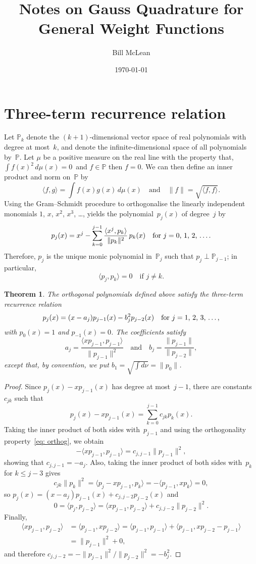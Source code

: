 \documentclass[12pt,a4paper]{article}
\title{Notes on Gauss Quadrature for General Weight Functions}
\author{Bill McLean}
\date{\today}
\newtheorem{theorem}{Theorem}
\newcommand{\iprod}[1]{\langle#1\rangle}
\newcommand{\Poly}{\mathbb{P}}
\begin{document}
\maketitle
\tableofcontents
\section{Three-term recurrence relation}
Let $\Poly_k$ denote the $(k+1)$-dimensional vector space of real 
polynomials with degree at most~$k$, and denote the 
infinite-dimensional space of all polynomials by~$\Poly$.  Let $\mu$ 
be a positive measure on the real line with the property that, 
$\int f(x)^2\,d\mu(x)=0$~and $f\in\Poly$ then $f=0$.
We can then define an inner product and norm on~$\Poly$  by
\[
\iprod{f,g}=\int f(x)g(x)\,d\mu(x)\quad\text{and}\quad
\|f\|=\sqrt{\iprod{f,f}}.
\]
Using the Gram--Schmidt procedure to orthogonalise the linearly 
independent monomials $1$, $x$, $x^2$, $x^3$, \dots, yields the
polynomial~$p_j(x)$ of degree~$j$ by
\[
p_j(x)=x^j-\sum_{k=0}^{j-1}\frac{\iprod{x^j,p_k}}{\|p_k\|^2}\,p_k(x)
	\quad\text{for $j=0$, $1$, $2$, \dots.}
\]
Therefore, $p_j$ is the unique monic polynomial in~$\Poly_j$ such 
that $p_j\perp\Poly_{j-1}$; in particular,
\begin{equation}\label{eq: orthog}
\iprod{p_j,p_k}=0\quad\text{if $j\ne k$.}
\end{equation}

\begin{theorem}\label{thm: 3 term}
The orthogonal polynomials defined above satisfy the three-term 
recurrence relation
\begin{equation}\label{eq: 3 term pj}
p_j(x)=(x-a_j)p_{j-1}(x)-b_j^2p_{j-2}(x)
	\quad\text{for $j=1$, $2$, $3$, \dots,}
\end{equation}
with $p_0(x)=1$ and $p_{-1}(x)=0$. The coefficients satisfy
\[
a_j=\frac{\iprod{xp_{j-1},p_{j-1}}}{\|p_{j-1}\|^2}
\quad\text{and}\quad
b_j=\frac{\|p_{j-1}\|}{\|p_{j-2}\|},
\]
except that, by convention, we put $b_1=\sqrt{\int d\nu}=\|p_0\|$.
\end{theorem}
\begin{proof}
Since $p_j(x)-xp_{j-1}(x)$ has degree at most~$j-1$, there are 
constants~$c_{jk}$ such that
\[
p_j(x)-xp_{j-1}(x)=\sum_{k=0}^{j-1}c_{jk}p_k(x).
\]
Taking the inner product of both sides with~$p_{j-1}$ and using
the orthogonality property~\eqref{eq: orthog}, we obtain
\[
-\iprod{xp_{j-1},p_{j-1}}=c_{j,j-1}\|p_{j-1}\|^2,
\]
showing that $c_{j,j-1}=-a_j$.  Also, taking the inner product of both
sides with~$p_k$ for $k\le j-3$ gives
\[
c_{jk}\|p_k\|^2=\iprod{p_j-xp_{j-1},p_k}=-\iprod{p_{j-1},xp_k}=0,
\]
so $p_j(x)=(x-a_j)p_{j-1}(x)+c_{j,j-2}p_{j-2}(x)$ and
\[
0=\iprod{p_j,p_{j-2}}=\iprod{xp_{j-1},p_{j-2}}+c_{j,j-2}\|p_{j-2}\|^2.
\]
Finally, 
\begin{align*}
\iprod{xp_{j-1},p_{j-2}}&=\iprod{p_{j-1},xp_{j-2}}
	=\iprod{p_{j-1},p_{j-1}}+\iprod{p_{j-1},xp_{j-2}-p_{j-1}}\\
	&=\|p_{j-1}\|^2+0,
\end{align*}
and therefore $c_{j,j-2}=-\|p_{j-1}\|^2/\|p_{j-2}\|^2=-b_j^2$.
\end{proof}
\end{document}
